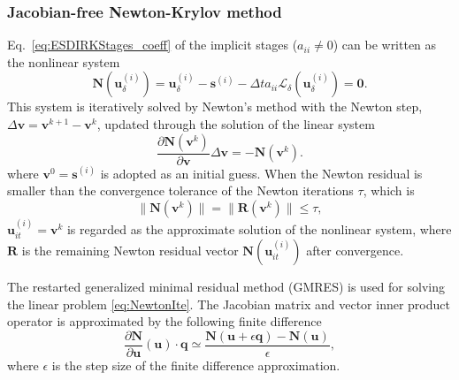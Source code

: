     \subsubsection{{Jacobian-free Newton-Krylov method}}\label{sec:Newton-Krylov}
      
      Eq.~\eqref{eq:ESDIRKStages_coeff} of the implicit stages ($a_{ii} \neq 0$) can be written as the nonlinear system  
      \begin{equation}\label{eq:NonlinSys}
          \textbf{N}(\textbf{u}_{\delta}^{(i)})=\textbf{u}_{\delta}^{(i)} - \textbf{s}^{(i)}-\Delta t a_{ii} \mathcal{L}_\delta\left(\textbf{u}_{\delta}^{(i)}\right) = \textbf{0}.
      \end{equation}
      This system is iteratively solved by Newton's method \cite{knoll_jacobian_free_2004} with the Newton step, $\Delta \textbf{v}=\textbf{v}^{k+1}-\textbf{v}^{k}$, updated through the solution of the linear system 
      \begin{equation}\label{eq:NewtonIte}
          \frac{\partial \textbf{N}(\textbf{v}^{k})}{\partial \textbf{v}}\Delta \textbf{v}=-\textbf{N}(\textbf{v}^{k}).
      \end{equation}
      where $\textbf{v}^{0} = \textbf{s}^{(i)}$ is adopted as an initial guess. When the Newton residual is smaller than the convergence tolerance  of the Newton iterations $\tau$, which is 
      \begin{equation}\label{eq:NewtonTol}
      \lVert \textbf{N}(\textbf{v}^{k}) \rVert = \lVert \textbf{R}(\textbf{v}^{k}) \rVert \leq \tau,
      \end{equation}
      $\textbf{u}_{it}^{(i)} = \textbf{v}^{k}$ is regarded as the approximate solution of the nonlinear system, where $\textbf{R}$ is the remaining Newton residual vector $\textbf{N}(\textbf{u}^{(i)}_{it})$ after convergence. 
      
      The restarted generalized minimal residual method (GMRES) \cite{saad_gmres:_1986} is used for solving the linear problem \eqref{eq:NewtonIte}. The Jacobian matrix and vector inner product operator is approximated by the following finite difference 
      \begin{equation}
          \frac{\partial\mathbf{N}}{\partial\mathbf{u}}\left(\mathbf{u}\right)\cdot\mathbf{q} \simeq \frac{\mathbf{N}(\mathbf{u}+\epsilon\mathbf{q})-\mathbf{N}(\mathbf{u})}{\epsilon},\label{eq:Jacobian-free-matrix}
      \end{equation}
      where $\epsilon$ is the step size of the finite difference approximation.


